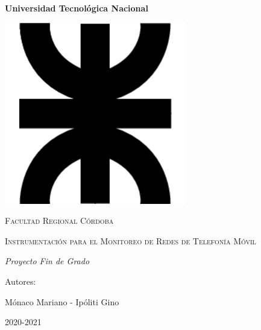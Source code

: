\documentclass[a4paper,12pt]{report} %
\begin{document}
	
%
	


	 \begin{titlepage}
		\centering
		\vspace{1cm}
		{\bfseries\LARGE Universidad Tecnológica Nacional \par}
		\vspace{1cm}
		{\includegraphics[scale=0.5]{Imagenes/logo}\par}
		\vspace{2cm}
		{\scshape\Large Facultad Regional Córdoba \par}
		\vspace{3cm}
		{\scshape\Huge Instrumentación para el Monitoreo de Redes de Telefonía Móvil \par}
		\vspace{3cm}
		{\itshape\Large Proyecto Fin de Grado \par}
		\vfill
		{\Large Autores: \par} %
		{\Large Mónaco Mariano - Ipóliti Gino \par}
		{\Large 2020-2021 \par}
	\end{titlepage} 

	
	
\tableofcontents
\thispagestyle{empty}
\cleardoublepage
\setcounter{page}{1}
\end{document}
